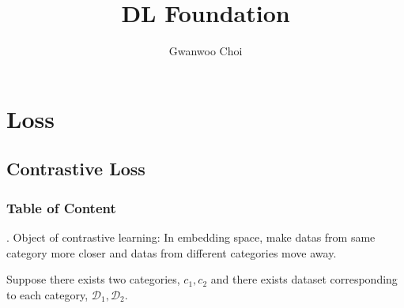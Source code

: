 \documentclass[8pt]{beamer}
\title{DL Foundation}
\author{Gwanwoo Choi}
\newcommand{\mc}[1]{\mathcal{#1}}
\begin{document}
\begin{frame}
    \titlepage
\end{frame}

\section{Loss}
\subsection{Contrastive Loss}

\begingroup
    \begin{frame}
        \frametitle{Table of Content}
        \tableofcontents
    \end{frame}
\endgroup

\begin{frame}{.}
    Object of contrastive learning: In embedding space, make datas from same category more closer and datas from different categories move away.

    \bigskip
    Suppose there exists two categories, $c_1, c_2$ and there exists dataset corresponding to each category, $\mc{D}_1, \mc{D}_2$.
\end{frame}
\end{document}
